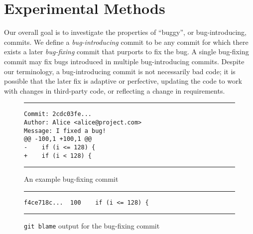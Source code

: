 \section{Experimental Methods}
\label{sec:method}

Our overall goal is to investigate the properties of ``buggy'', or
bug-introducing, commits. We define a \emph{bug-introducing} commit to be any
commit for which there exists a later \emph{bug-fixing} commit that purports to
fix the bug. A single bug-fixing commit may fix bugs introduced in multiple
bug-introducing commits. Despite our terminology, a bug-introducing commit is
not necessarily bad code; it is possible that the later fix is adaptive or
perfective, updating the code to work with changes in third-party code, or
reflecting a change in requirements.

\begin{figure}[t!bh]
\centering
\rule{0.92\columnwidth}{0.5pt}
\begin{minipage}[h]{0.92\columnwidth}
\begin{lstlisting}[basicstyle=\small]
Commit: 2cdc03fe...
Author: Alice <alice@project.com>
Message: I fixed a bug!
@@ -100,1 +100,1 @@
-    if (i <= 128) {
+    if (i < 128) {
\end{lstlisting}
\end{minipage}
\rule{0.92\columnwidth}{0.5pt}
\caption{\label{fig-fix}An example bug-fixing commit}
\end{figure}

\begin{figure}[t!bh]
\centering
\rule{0.92\columnwidth}{0.5pt}
\begin{minipage}[h]{0.92\columnwidth}
\begin{lstlisting}[basicstyle=\small]
f4ce718c...  100    if (i <= 128) {
\end{lstlisting}
\end{minipage}
\rule{0.92\columnwidth}{0.5pt}
\caption{\label{fig-blame}{\tt git blame} output for the bug-fixing commit}
\end{figure}

